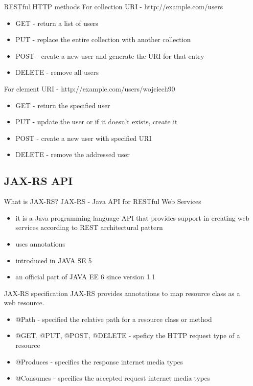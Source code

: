 	\begin{frame}{RESTful HTTP methods}	
		For collection URI - http://example.com/users
		\begin{itemize}
		  \item GET - return a list of users
		  \item PUT - replace the entire collection with another collection
		  \item POST - create a new user and generate the URI for that entry
		  \item DELETE - remove all users
		\end{itemize}
		
		\vspace{1cm}
		
		For element URI - http://example.com/users/wojciech90
		\begin{itemize}
		  \item GET - return the specified user
		  \item PUT - update the user or if it doesn't exists, create it
		  \item POST - create a new user with specified URI
		  \item DELETE - remove the addressed user
		\end{itemize}
	\end{frame}	
  
\subsection{JAX-RS API}
	\begin{frame}{What is JAX-RS?}
		JAX-RS - Java API for RESTful Web Services
	
    	\begin{itemize}
			\item it is a Java programming language API that provides support in creating web services according to REST architectural pattern
			\item uses annotations
			\item introduced in JAVA SE 5
			\item an official part of JAVA EE 6 since version 1.1
		\end{itemize}
	\end{frame}
	
	\begin{frame}{JAX-RS specification}
		JAX-RS provides annotations to map resource class as a web resource.
		\begin{itemize}
		  \item @Path - specified the relative path for a resource class or method
		  \item @GET, @PUT, @POST, @DELETE - speficy the HTTP request type of a resource
		  \item @Produces - specifies the response internet media types
		  \item @Consumes - specifies the accepted request internet media types
		\end{itemize}	
	\end{frame}
	
